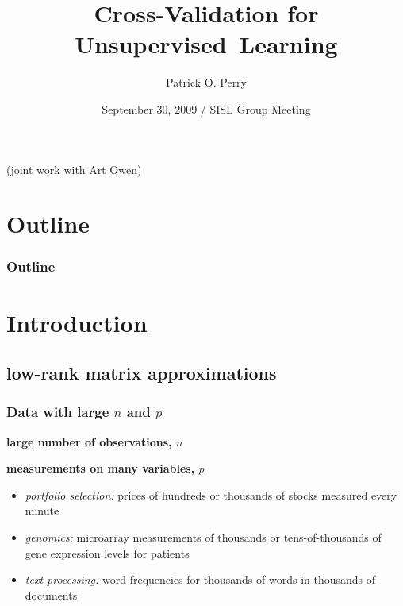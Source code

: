 \documentclass{beamer}
\title{Cross-Validation for Unsupervised~Learning}
\author[P. O. Perry]{Patrick O. Perry}
\institute[Harvard University] 
{
  Statistics and Information Sciences Laboratory\\
  Harvard University
}
\date[SISL Group Meeting]
{September 30, 2009 / SISL Group Meeting}
\begin{document}
\begin{frame}
  \titlepage
  \hfill\small{(joint work with Art Owen)}
\end{frame}

\section*{Outline}
\begin{frame}
  \frametitle{Outline}
  \tableofcontents
\end{frame}


\section{Introduction}

\subsection{low-rank matrix approximations}
\begin{frame}
\frametitle{Data with large $n$ and $p$}
  \textbf{large number of observations, $n$}

  \textbf{measurements on many variables, $p$} 

  \begin{itemize}
  \item \textit{portfolio selection:} prices of hundreds or thousands of stocks measured every minute 
  \item \textit{genomics:} microarray measurements of thousands or tens-of-thousands of gene expression levels for patients
  \item \textit{text processing:} word frequencies for thousands of words in thousands of documents
  \end{itemize}
\end{frame}

\end{document}
